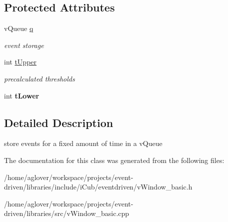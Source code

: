 \subsection*{Protected Attributes}
\begin{DoxyCompactItemize}
\item 
v\+Queue \hyperlink{classev_1_1vTempWindow_abed022ad51f68443a2350fbeabbb4233}{q}\hypertarget{classev_1_1vTempWindow_abed022ad51f68443a2350fbeabbb4233}{}\label{classev_1_1vTempWindow_abed022ad51f68443a2350fbeabbb4233}

\begin{DoxyCompactList}\small\item\em event storage \end{DoxyCompactList}\item 
int \hyperlink{classev_1_1vTempWindow_a909a8f6df0014d1f318c6209223f5fad}{t\+Upper}\hypertarget{classev_1_1vTempWindow_a909a8f6df0014d1f318c6209223f5fad}{}\label{classev_1_1vTempWindow_a909a8f6df0014d1f318c6209223f5fad}

\begin{DoxyCompactList}\small\item\em precalculated thresholds \end{DoxyCompactList}\item 
int {\bfseries t\+Lower}\hypertarget{classev_1_1vTempWindow_a47845a9e47b73598e2a325c06e994bed}{}\label{classev_1_1vTempWindow_a47845a9e47b73598e2a325c06e994bed}

\end{DoxyCompactItemize}


\subsection{Detailed Description}
store events for a fixed amount of time in a v\+Queue 

The documentation for this class was generated from the following files\+:\begin{DoxyCompactItemize}
\item 
/home/aglover/workspace/projects/event-\/driven/libraries/include/i\+Cub/eventdriven/v\+Window\+\_\+basic.\+h\item 
/home/aglover/workspace/projects/event-\/driven/libraries/src/v\+Window\+\_\+basic.\+cpp\end{DoxyCompactItemize}

